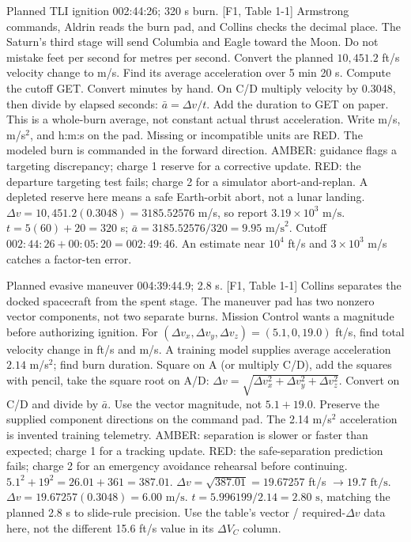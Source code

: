 {Planned TLI ignition 002:44:26; 320 s burn. [F1, Table 1-1]}
{Armstrong commands, Aldrin reads the burn pad, and Collins checks the
decimal place. The Saturn's third stage will send Columbia and Eagle
toward the Moon. Do not mistake feet per second for metres per second.}
{Convert the planned \(10{,}451.2\) ft/s velocity change to m/s.
Find its average acceleration over 5 min 20 s. Compute the cutoff GET.}
{Convert minutes by hand. On C/D multiply velocity by 0.3048, then divide
by elapsed seconds: \(\bar a=\Delta v/t\). Add the duration to GET on paper.
This is a whole-burn average, not constant actual thrust acceleration.}
{Write m/s, m/s\(^{2}\), and h:m:s on the pad. Missing or incompatible
units are RED. The modeled burn is commanded in the forward direction.}
{AMBER: guidance flags a targeting discrepancy; charge 1 reserve for a
corrective update. RED: the departure targeting test fails; charge 2 for
a simulator abort-and-replan. A depleted reserve here means a safe
Earth-orbit abort, not a lunar landing.}
{\(\Delta v=10{,}451.2(0.3048)=3185.52576\) m/s, so report
\(\boxed{3.19\times10^3\text{ m/s}}\).
\(t=5(60)+20=320\) s;
\(\bar a=3185.52576/320=\boxed{9.95\text{ m/s}^2}\).
Cutoff \(002{:}44{:}26+00{:}05{:}20=\boxed{002{:}49{:}46}\).
An estimate near \(10^4\) ft/s and \(3\times10^3\) m/s catches a factor-ten error.}

{Planned evasive maneuver 004:39:44.9; 2.8 s. [F1, Table 1-1]}
{Collins separates the docked spacecraft from the spent stage.
The maneuver pad has two nonzero vector components, not two separate
burns. Mission Control wants a magnitude before authorizing ignition.}
{For \((\Delta v_x,\Delta v_y,\Delta v_z)=(5.1,0,19.0)\) ft/s,
find total velocity change in ft/s and m/s. A training model supplies
average acceleration \(2.14\) m/s\(^{2}\); find burn duration.}
{Square on A (or multiply C/D), add the squares with pencil, take the
square root on A/D:
\(\Delta v=\sqrt{\Delta v_x^2+\Delta v_y^2+\Delta v_z^2}\).
Convert on C/D and divide by \(\bar a\).}
{Use the vector magnitude, not \(5.1+19.0\).
Preserve the supplied component directions on the command pad.
The 2.14 m/s\(^{2}\) acceleration is invented training telemetry.}
{AMBER: separation is slower or faster than expected; charge 1 for a
tracking update. RED: the safe-separation prediction fails; charge 2
for an emergency avoidance rehearsal before continuing.}
{\(5.1^2+19^2=26.01+361=387.01\).
\(\Delta v=\sqrt{387.01}=19.67257\) ft/s
\(\rightarrow\boxed{19.7\text{ ft/s}}\).
\(\Delta v=19.67257(0.3048)=\boxed{6.00\text{ m/s}}\).
\(t=5.996199/2.14=\boxed{2.80\text{ s}}\), matching the
planned 2.8 s to slide-rule precision.
Use the table's vector / required-\(\Delta v\) data here, not the
different 15.6 ft/s value in its \(\Delta V_C\) column.}

